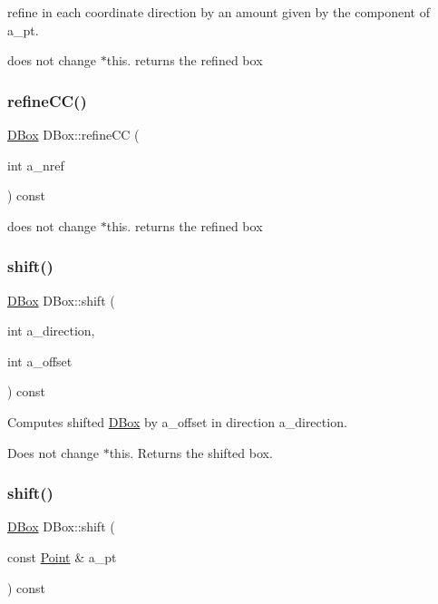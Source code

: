 refine in each coordinate direction by an amount given by the component of a\+\_\+pt. 

does not change $\ast$this. returns the refined box \mbox{\label{class_d_box_af4826905ec8e333891898b129c8c4951}} 
\subsubsection{\texorpdfstring{refine\+C\+C()}{refineCC()}\hspace{0.1cm}{\footnotesize\ttfamily [2/2]}}
{\footnotesize\ttfamily \hyperlink{class_d_box}{D\+Box} D\+Box\+::refine\+CC (\begin{DoxyParamCaption}\item[{int}]{a\+\_\+nref }\end{DoxyParamCaption}) const}

does not change $\ast$this. returns the refined box \mbox{\label{class_d_box_a62403e537be588d0af273cb9d84e089c}} 
\subsubsection{\texorpdfstring{shift()}{shift()}\hspace{0.1cm}{\footnotesize\ttfamily [1/2]}}
{\footnotesize\ttfamily \hyperlink{class_d_box}{D\+Box} D\+Box\+::shift (\begin{DoxyParamCaption}\item[{int}]{a\+\_\+direction,  }\item[{int}]{a\+\_\+offset }\end{DoxyParamCaption}) const}



Computes shifted \hyperlink{class_d_box}{D\+Box} by a\+\_\+offset in direction a\+\_\+direction. 

Does not change $\ast$this. Returns the shifted box. \mbox{\label{class_d_box_ad01e33bf0839296a79a315c4dc17f97c}} 
\subsubsection{\texorpdfstring{shift()}{shift()}\hspace{0.1cm}{\footnotesize\ttfamily [2/2]}}
{\footnotesize\ttfamily \hyperlink{class_d_box}{D\+Box} D\+Box\+::shift (\begin{DoxyParamCaption}\item[{const \hyperlink{class_point}{Point} \&}]{a\+\_\+pt }\end{DoxyParamCaption}) const}



